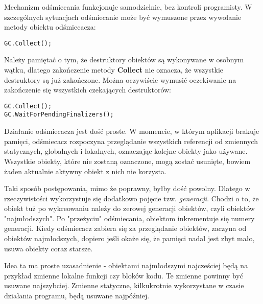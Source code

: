 Mechanizm odśmiecania funkcjonuje samodzielnie, bez kontroli programisty. W szczególnych
sytuacjach odśmiecanie może być wymuszone przez wywołanie metody obiektu odśmiecacza:

\begin{scriptsize}
\begin{verbatim}
GC.Collect();
\end{verbatim}
\end{scriptsize}

Należy pamiętać o tym, że destruktory obiektów są wykonywane w osobnym wątku, dlatego zakończenie
metody {\bf Collect} nie oznacza, że wszystkie destruktory są już zakończone. Można oczywiście wymusić
oczekiwanie na zakończenie się wszystkich czekających destruktorów:

\begin{scriptsize}
\begin{verbatim}
GC.Collect();
GC.WaitForPendingFinalizers();
\end{verbatim}
\end{scriptsize}

Działanie odśmiecacza jest dość proste. W momencie, w którym aplikacji brakuje pamięci, odśmiecacz
rozpoczyna przeglądanie wszystkich referencji od zmiennych statycznych, globalnych i lokalnych, oznaczając
kolejne obiekty jako używane. Wszystkie obiekty, które nie zostaną oznaczone, mogą zostać usunięte, bowiem
żaden aktualnie aktywny obiekt z nich nie korzysta.

Taki sposób postępowania, mimo że poprawny, byłby dość powolny. Dlatego w rzeczywistości wykorzystuje się
dodatkowo pojęcie tzw. {\em generacji}. Chodzi o to, że obiekt tuż po wykreowaniu 
należy do zerowej generacji obiektów, czyli obiektów "najmłodszych". Po "przeżyciu" odśmiecania,
obiektom inkrementuje się numery generacji. Kiedy odśmiecacz zabiera się za przeglądanie obiektów,
zaczyna od obiektów najmłodszych, dopiero jeśli okaże się, że pamięci nadal jest zbyt mało, usuwa obiekty
coraz starsze.

Idea ta ma proste uzasadnienie - obiektami najmłodszymi najcześciej będą na przykład zmienne lokalne funkcji
czy bloków kodu. Te zmienne powinny być usuwane najszybciej. Zmienne statyczne, kilkukrotnie wykorzystane 
w czasie działania programu, będą usuwane najpóźniej.

